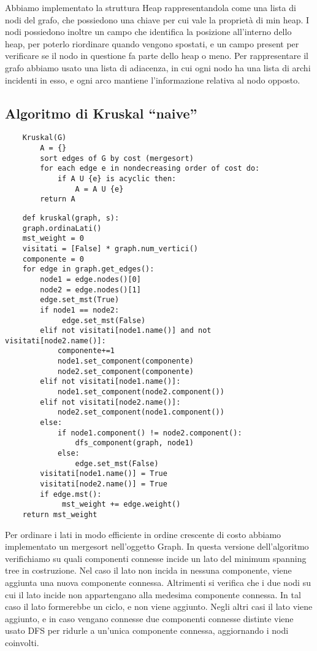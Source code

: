 Abbiamo implementato la struttura Heap rappresentandola come una lista di nodi del grafo, che possiedono una chiave per cui vale la proprietà di min heap.
I nodi possiedono inoltre un campo che identifica la posizione all'interno dello heap, per poterlo riordinare quando vengono spostati, e un campo present per verificare se il nodo in questione fa parte dello heap o meno.
Per rappresentare il grafo abbiamo usato una lista di adiacenza, in cui ogni nodo ha una lista di archi incidenti in esso, e ogni arco mantiene l'informazione relativa al nodo opposto.

\clearpage

\subsection{Algoritmo di Kruskal ``naive''\label{sec:naive}}
\begin{verbatim}
    Kruskal(G)
        A = {}
        sort edges of G by cost (mergesort)
        for each edge e in nondecreasing order of cost do:
            if A U {e} is acyclic then:
                A = A U {e}
        return A
\end{verbatim}    

\begin{verbatim}
    def kruskal(graph, s):
    graph.ordinaLati()
    mst_weight = 0
    visitati = [False] * graph.num_vertici()
    componente = 0
    for edge in graph.get_edges(): 
        node1 = edge.nodes()[0]
        node2 = edge.nodes()[1]
        edge.set_mst(True)
        if node1 == node2:
             edge.set_mst(False)
        elif not visitati[node1.name()] and not visitati[node2.name()]:
            componente+=1
            node1.set_component(componente)
            node2.set_component(componente)
        elif not visitati[node1.name()]:
            node1.set_component(node2.component())
        elif not visitati[node2.name()]:
            node2.set_component(node1.component())
        else:
            if node1.component() != node2.component():
                dfs_component(graph, node1)
            else:
                edge.set_mst(False)
        visitati[node1.name()] = True
        visitati[node2.name()] = True        
        if edge.mst():
             mst_weight += edge.weight()          
    return mst_weight
\end{verbatim}

Per ordinare i lati in modo efficiente in ordine crescente di costo abbiamo implementato un mergesort nell'oggetto Graph.
In questa versione dell'algoritmo verifichiamo su quali componenti connesse incide un lato del minimum spanning tree in costruzione.
Nel caso il lato non incida in nessuna componente, viene aggiunta una nuova componente connessa.
Altrimenti si verifica che i due nodi su cui il lato incide non appartengano alla medesima componente connessa. In tal caso il lato formerebbe un ciclo, e non viene aggiunto.
Negli altri casi il lato viene aggiunto, e in caso vengano connesse due componenti connesse distinte viene usato DFS per ridurle a un'unica componente connessa, aggiornando i nodi coinvolti.

